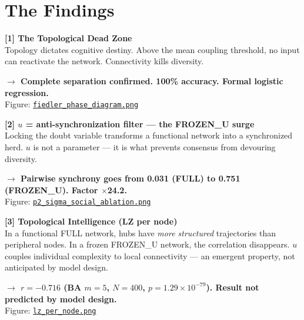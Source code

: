\documentclass[11pt, a4paper]{article}
\newcommand{\result}[1]{\textbf{\color{positive}#1}}
\begin{document}
\section{The Findings}

\begin{finding}
\textbf{[1] The Topological Dead Zone}\\
Topology dictates cognitive destiny. Above the mean coupling threshold, no input can reactivate the
network. Connectivity kills diversity.

\result{$\rightarrow$ Complete separation confirmed. 100\% accuracy. Formal logistic regression.}\\
Figure: \href{https://github.com/cafe-virtuel/Mem4ristor/blob/main/figures/fiedler_phase_diagram.png}{\texttt{fiedler\_phase\_diagram.png}}
\end{finding}

\vspace{0.5em}

\begin{finding}
\textbf{[2] $u$ = anti-synchronization filter --- the FROZEN\_U surge}\\
Locking the doubt variable transforms a functional network into a synchronized herd. $u$ is not a
parameter --- it is what prevents consensus from devouring diversity.

\result{$\rightarrow$ Pairwise synchrony goes from 0.031 (FULL) to 0.751 (FROZEN\_U). Factor $\times$24.2.}\\
Figure: \href{https://github.com/cafe-virtuel/Mem4ristor/blob/main/figures/p2_sigma_social_ablation.png}{\texttt{p2\_sigma\_social\_ablation.png}}
\end{finding}

\vspace{0.5em}

\begin{finding}
\textbf{[3] Topological Intelligence (LZ per node)}\\
In a functional FULL network, hubs have \textit{more structured} trajectories than peripheral nodes.
In a frozen FROZEN\_U network, the correlation disappears. $u$ couples individual complexity to
local connectivity --- an emergent property, not anticipated by model design.

\result{$\rightarrow$ $r = -0.716$ (BA $m=5$, $N=400$, $p = 1.29 \times 10^{-79}$). Result not predicted by model design.}\\
Figure: \href{https://github.com/cafe-virtuel/Mem4ristor/blob/main/figures/lz_per_node.png}{\texttt{lz\_per\_node.png}}
\end{finding}
\end{document}
